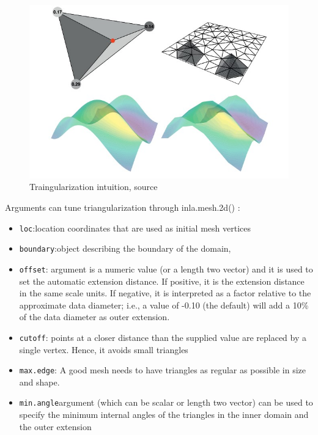 \documentclass[
  12pt,
  a4paper,
  oneside]{book}
\newcommand{\passthrough}[1]{#1}
\providecommand{\tightlist}{%
  \setlength{\itemsep}{0pt}\setlength{\parskip}{0pt}}
\theoremstyle{definition}
\theoremstyle{definition}
\theoremstyle{definition}
\theoremstyle{remark}
\begin{document}
\begin{figure}
\centering
\includegraphics{images/triangle.jpg}
\caption{Traingularization intuition, \citet{Krainski-Rubio} source}
\end{figure}

Arguments can tune triangularization through inla.mesh.2d() :

\begin{itemize}
\tightlist
\item
  \passthrough{\lstinline!loc!}:location coordinates that are used as initial mesh vertices
\item
  \passthrough{\lstinline!boundary!}:object describing the boundary of the domain,
\item
  \passthrough{\lstinline!offset!}: argument is a numeric value (or a length two vector) and it is used
  to set the automatic extension distance. If positive, it is the extension distance
  in the same scale units. If negative, it is interpreted as a factor relative to the
  approximate data diameter; i.e., a value of -0.10 (the default) will add a 10\%
  of the data diameter as outer extension.
\item
  \passthrough{\lstinline!cutoff!}: points at a closer distance than the supplied value are replaced by a single vertex. Hence, it avoids small triangles
\item
  \passthrough{\lstinline!max.edge!}: A good mesh needs to have triangles as regular as possible in size and shape.
\item
  \passthrough{\lstinline!min.angle!}argument (which can be scalar or length two vector) can be used to specify the minimum internal angles of the triangles in the inner domain and the outer extension
\end{itemize}
\end{document}
